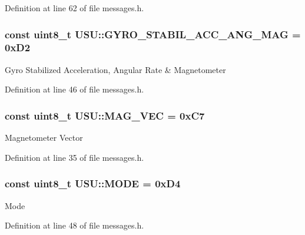 \-Definition at line 62 of file messages.\-h.

\hypertarget{namespace_u_s_u_a21b21aa9bf4f65bb8f89f61c853b0d65}{
\subsubsection[{\-G\-Y\-R\-O\-\_\-\-S\-T\-A\-B\-I\-L\-\_\-\-A\-C\-C\-\_\-\-A\-N\-G\-\_\-\-M\-A\-G}]{\setlength{\rightskip}{0pt plus 5cm}const uint8\-\_\-t {\bf \-U\-S\-U\-::\-G\-Y\-R\-O\-\_\-\-S\-T\-A\-B\-I\-L\-\_\-\-A\-C\-C\-\_\-\-A\-N\-G\-\_\-\-M\-A\-G} = 0x\-D2}}\label{namespace_u_s_u_a21b21aa9bf4f65bb8f89f61c853b0d65}
\-Gyro \-Stabilized \-Acceleration, \-Angular \-Rate \& \-Magnetometer 

\-Definition at line 46 of file messages.\-h.

\hypertarget{namespace_u_s_u_a85ca84f12076e3251addb0c96317c83a}{
\subsubsection[{\-M\-A\-G\-\_\-\-V\-E\-C}]{\setlength{\rightskip}{0pt plus 5cm}const uint8\-\_\-t {\bf \-U\-S\-U\-::\-M\-A\-G\-\_\-\-V\-E\-C} = 0x\-C7}}\label{namespace_u_s_u_a85ca84f12076e3251addb0c96317c83a}
\-Magnetometer \-Vector 

\-Definition at line 35 of file messages.\-h.

\hypertarget{namespace_u_s_u_afb689aa4352de24daaa765fd9e625ae3}{
\subsubsection[{\-M\-O\-D\-E}]{\setlength{\rightskip}{0pt plus 5cm}const uint8\-\_\-t {\bf \-U\-S\-U\-::\-M\-O\-D\-E} = 0x\-D4}}\label{namespace_u_s_u_afb689aa4352de24daaa765fd9e625ae3}
\-Mode 

\-Definition at line 48 of file messages.\-h.

